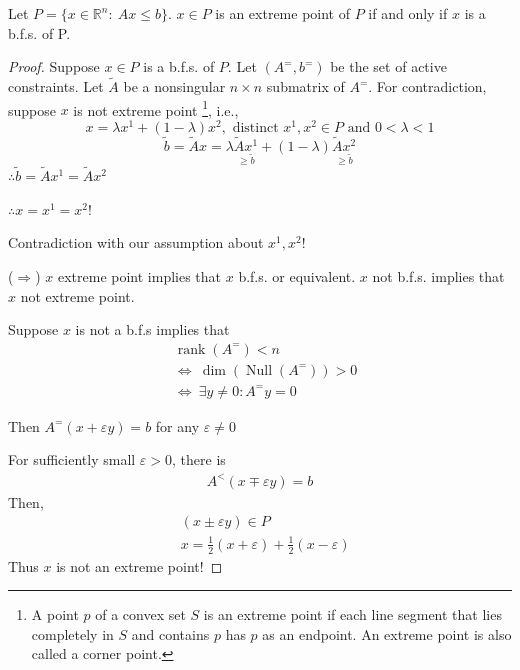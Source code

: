 \documentclass[11pt]{article}
\numberwithin{equation}{section}
\begin{document}
\begin{theorem}
    Let $P=\{x \in \mathbb{R}^n: \ Ax \leq b\}$. $x \in P$ is an extreme point of $P$ if and only if $x$ is a b.f.s. of P.
    \begin{proof}
        Suppose $x \in P$ is a b.f.s. of $P$. Let $(A^=,b^=)$ be the set of active constraints. Let $\tilde{A}$ be a nonsingular $n \times n$ submatrix of $A^=$.
        For contradiction, suppose $x$ is not extreme point \footnote{A point $p$ of a convex set $S$ is an extreme point if each line
        segment that lies completely in $S$ and contains $p$ has $p$ as an endpoint. An extreme point is also called a corner point.}, i.e., 
        $$x=\lambda x^1 + (1-\lambda)x^2, \text{ distinct } x^1, x^2 \in P \text{ and } 0<\lambda < 1$$
        $$\tilde{b}=\tilde{A}x = \lambda \underset{\geq \tilde{b}}{\tilde{A}x^1} + (1-\lambda)\underset{\geq \tilde{b}}{\tilde{A}x^2} $$
        $\therefore \tilde{b}=\tilde{A} x^{1}=\tilde{A} x^{2}$
        
        $\therefore x= x^{1}= x^{2}$!
        
        Contradiction with our assumption about $x^1, x^2$!

        ($\Longrightarrow$) $x$ extreme point implies that $x$ b.f.s. or equivalent. $x$ not b.f.s. implies that $x$ not extreme point. 
        
        Suppose $x$ is not a b.f.s implies that \begin{align*}
            & \operatorname{rank}(A^=)<n \\
            & \Leftrightarrow \ \operatorname{dim}(\operatorname{Null}(A^=)) > 0 \\
            & \Leftrightarrow \ \exists y \neq 0: A^=y=0
        \end{align*}

        Then $A^{=}(x+\varepsilon y)=b$ for any $\varepsilon \neq 0$

        For sufficiently small $\varepsilon > 0$, there is \begin{align*}
            A^<( x \mp \varepsilon y)=b
        \end{align*}
        Then, \begin{align*}
            & (x \pm \varepsilon y) \in P \\
            & x=\frac{1}{2}(x+\varepsilon) + \frac{1}{2}(x-\varepsilon)
        \end{align*}
        Thus $x$ is not an extreme point!
    \end{proof}
\end{theorem}
\end{document}
